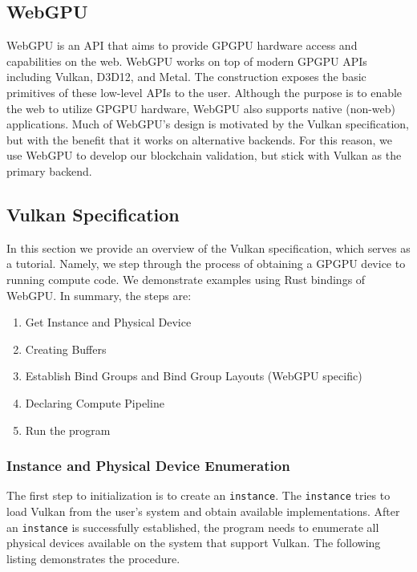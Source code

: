 \documentclass{article}
\begin{document}
\subsection{WebGPU}
WebGPU is an API that aims to provide GPGPU hardware access and capabilities on the web. WebGPU works on top of modern GPGPU APIs including Vulkan, D3D12, and Metal. The construction exposes the basic primitives of these low-level APIs to the user. Although the purpose is to enable the web to utilize GPGPU hardware, WebGPU also supports native (non-web) applications. Much of WebGPU's design is motivated by the Vulkan specification, but with the benefit that it works on alternative backends. For this reason, we use WebGPU to develop our blockchain validation, but stick with Vulkan as the primary backend. 

\subsection{Vulkan Specification}

In this section we provide an overview of the Vulkan specification, which serves as a tutorial. Namely, we step through the process of obtaining a GPGPU device to running compute code. We demonstrate examples using Rust bindings of WebGPU. In summary, the steps are:

\begin{enumerate}
    \item Get Instance and Physical Device
    \item Creating Buffers
    \item Establish Bind Groups and Bind Group Layouts (WebGPU specific) 
    \item Declaring Compute Pipeline
    \item Run the program
\end{enumerate}

\subsubsection{Instance and Physical Device Enumeration}

The first step to initialization is to create an \texttt{instance}. The \texttt{instance} tries to load Vulkan from the user's system and obtain available implementations. After an \texttt{instance} is successfully established, the program needs to enumerate all physical devices available on the system that support Vulkan. The following listing demonstrates the procedure.
\end{document}
